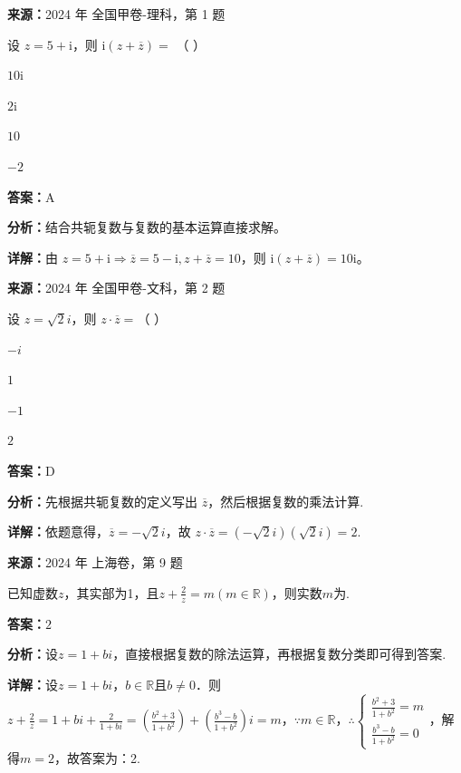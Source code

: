 \begin{question}[points=5]
\textbf{来源：}2024 年 全国甲卷-理科，第 1 题\par
设 $z=5+\mathrm{i}$，则 $\mathrm{i}(z+\overline{z})=$ （   ）
\begin{choices}
  \item $10\mathrm{i}$
  \item $2\mathrm{i}$
  \item $10$
  \item $-2$
\end{choices}
\begin{solution}
\textbf{答案：}A

\textbf{分析：}结合共轭复数与复数的基本运算直接求解。

\textbf{详解：}由 $z=5+\mathrm{i}\Rightarrow\overline{z}=5-\mathrm{i},z+\overline{z}=10$，则 $\mathrm{i}(z+\overline{z})=10\mathrm{i}$。
\end{solution}
\end{question}

\begin{question}[points=5]
\textbf{来源：}2024 年 全国甲卷-文科，第 2 题\par
设 $z = \sqrt{2}i$，则 $z \cdot \overline{z} =$（ ）
\begin{choices}
  \item $-i$
  \item $1$
  \item $-1$
  \item $2$
\end{choices}
\begin{solution}
\textbf{答案：}D

\textbf{分析：}先根据共轭复数的定义写出 $\overline{z}$，然后根据复数的乘法计算.

\textbf{详解：}依题意得，$\overline{z} = -\sqrt{2}i$，故 $z \cdot \overline{z} = (-\sqrt{2}i)(\sqrt{2}i) = 2$.
\end{solution}
\end{question}

\begin{question}[points=5]
\textbf{来源：}2024 年 上海卷，第 9 题\par
已知虚数$z$，其实部为1，且$z+\frac{2}{z}=m(m\in\mathbb{R})$，则实数$m$为.
\fillin[{$2$}]
\begin{solution}
\textbf{答案：}$2$

\textbf{分析：}设$z=1+bi$，直接根据复数的除法运算，再根据复数分类即可得到答案.

\textbf{详解：}设$z=1+bi$，$b\in\mathbb{R}$且$b\neq0$．则$z+\frac{2}{z}=1+bi+\frac{2}{1+bi}=\left(\frac{b^2+3}{1+b^2}\right)+\left(\frac{b^3-b}{1+b^2}\right)i=m$，$\because m\in\mathbb{R}$，$\therefore \begin{cases} \frac{b^2+3}{1+b^2}=m \\ \frac{b^3-b}{1+b^2}=0 \end{cases}$，解得$m=2$，故答案为：2.
\end{solution}
\end{question}

